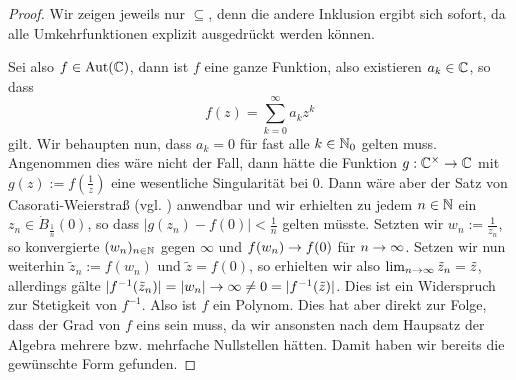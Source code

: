 \begin{proof}
  Wir zeigen jeweils nur $\subseteq$, denn die andere Inklusion ergibt
  sich sofort, da alle Umkehrfunktionen explizit ausgedrückt werden
  können.

  Sei also $f \in \operatorname{Aut}(\mathbb{C})$, dann ist $f$ eine ganze Funktion, also
  existieren $a_k \in \mathbb{C}$, so dass
  \[
  f(z) = \sum_{k=0}^\infty a_k z^k
  \]
  gilt. Wir behaupten nun, dass $a_k = 0$ für fast alle $k \in \mathbb{N}_0$
  gelten muss. Angenommen dies wäre nicht der Fall, dann hätte die
  Funktion $g: \mathbb{C}^\times \rightarrow \mathbb{C}$ mit $g(z) := f(\frac{1}{z})$ eine
  wesentliche Singularität bei $0$. Dann wäre aber der Satz von
  Casorati-Weierstraß (vgl. \cite[Satz 6.11]{Kas}) anwendbar und wir
  erhielten zu jedem $n \in \mathbb{N}$
  ein $z_n \in \dot B_{\frac{1}{n}}(0)$, so dass $|g(z_n) - f(0)| <
  \frac{1}{n}$ gelten müsste. Setzten wir $w_n := \frac{1}{z_n}$, so konvergierte
  $(w_n)_{n \in \mathbb{N}}$ gegen $\infty$ und $f(w_n) \rightarrow f(0)$ für $n \rightarrow
  \infty$. Setzen wir nun weiterhin $\tilde z_n := f(w_n)$ und $\tilde
  z = f(0)$, so erhielten wir also $\lim_{n \rightarrow \infty} \tilde z_n =
  \tilde z$, allerdings gälte $|f^{-1}(\tilde z_n)| = |w_n| \rightarrow \infty
  \neq 0 = |f^{-1}(\tilde z)|$. Dies ist ein Widerspruch zur
  Stetigkeit von $f^{-1}$. Also ist $f$ ein Polynom. Dies hat aber
  direkt zur Folge, dass der Grad von $f$ eins sein muss, da wir
  ansonsten nach dem Haupsatz der Algebra mehrere bzw. mehrfache Nullstellen
  hätten. Damit haben wir bereits die gewünschte Form gefunden.


\end{proof}

